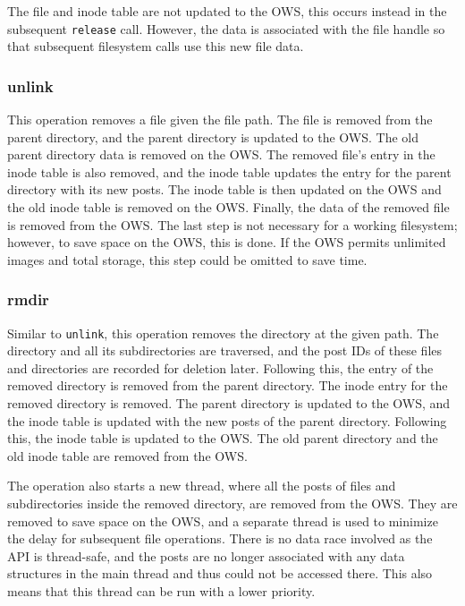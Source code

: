 The file and inode table are not updated to the \gls{OWS}, this occurs instead in the subsequent \texttt{release} call. However, the data is associated with the file handle so that subsequent filesystem calls use this new file data.

\subsubsection{unlink}
This operation removes a file given the file path. The file is removed from the parent directory, and the parent directory is updated to the \gls{OWS}. The old parent directory data is removed on the \gls{OWS}. The removed file's entry in the inode table is also removed, and the inode table updates the entry for the parent directory with its new posts. The inode table is then updated on the \gls{OWS} and the old inode table is removed on the \gls{OWS}. Finally, the data of the removed file is removed from the \gls{OWS}. The last step is not necessary for a working filesystem; however, to save space on the \gls{OWS}, this is done. If the \gls{OWS} permits unlimited images and total storage, this step could be omitted to save time.

\subsubsection{rmdir}
Similar to \texttt{unlink}, this operation removes the directory at the given path. The directory and all its subdirectories are traversed, and the post IDs of these files and directories are recorded for deletion later. Following this, the entry of the removed directory is removed from the parent directory. The inode entry for the removed directory is removed. The parent directory is updated to the \gls{OWS}, and the inode table is updated with the new posts of the parent directory. Following this, the inode table is updated to the \gls{OWS}. The old parent directory and the old inode table are removed from the \gls{OWS}.

The operation also starts a new thread, where all the posts of files and subdirectories inside the removed directory, are removed from the \gls{OWS}. They are removed to save space on the \gls{OWS}, and a separate thread is used to minimize the delay for subsequent file operations. There is no data race involved as the \gls{API} is \mbox{thread-safe}, and the posts are no longer associated with any data structures in the main thread and thus could not be accessed there. This also means that this thread can be run with a lower priority.

